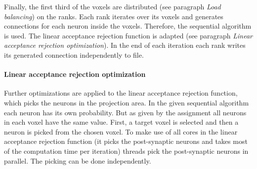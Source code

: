 Finally, the first third of the voxels are distributed (see paragraph \emph{Load balancing}) on the ranks.
Each rank iterates over its voxels and generates connections for each neuron inside the voxels.
Therefore, the sequential algorithm is used. The linear acceptance rejection function is adapted (see paragraph \emph{Linear acceptance rejection optimization}).
In the end of each iteration each rank writes its generated connection independently to file.

\paragraph{Linear acceptance rejection optimization}
\label{par:linearacceptancerejection}
Further optimizations are applied to the linear acceptance rejection function,
which picks the neurons in the projection area.
In the given sequential algorithm each neuron has its own probability.
But as given by the assignment all neurons in each voxel have the same value.
First, a target voxel is selected and then a neuron is picked from the chosen voxel.
To make use of all cores in the linear acceptance rejection function
(it picks the post-synaptic neurons and takes most of the computation time per iteration)
threads pick the post-synaptic neurons in parallel.
The picking can be done independently.



